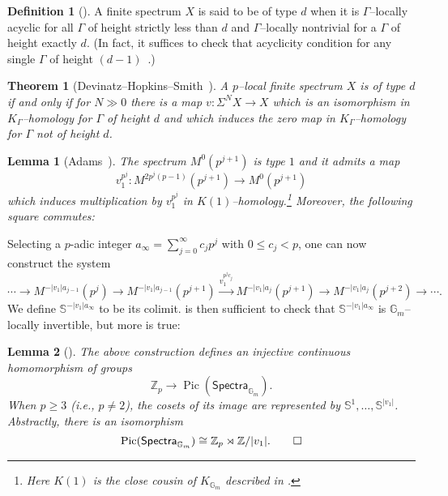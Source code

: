 \documentclass{amsart}
\newcommand{\Z}{\mathbb Z}
\renewcommand{\S}{\mathbb S}
\newcommand{\G}{\mathbb G}
\newcommand{\<}{\langle}
\renewcommand{\>}{\rangle}
\newcommand{\Susp}{\Sigma}
\newcommand{\CatOf}[1]{\mathsf{#1}}
\DeclareMathOperator{\Pic}{Pic}
\theoremstyle{plain}
\newtheorem*{theorem}{Theorem}
\newtheorem*{lemma}{Lemma}
\theoremstyle{definition}
\newtheorem*{definition}{Definition}
\theoremstyle{remark}
\begin{document}
\begin{definition}[{\cite[Definition 1.5.3]{RavenelOrangeBook}}]
A finite spectrum $X$ is said to be of type $d$ when it is $\Gamma$--locally acyclic for all $\Gamma$ of height strictly less than $d$ and $\Gamma$--locally nontrivial for a $\Gamma$ of height exactly $d$.  (In fact, it suffices to check that acyclicity condition for any single $\Gamma$ of height $(d-1)$~\cite[Theorem 2.11]{RavenelLocalizationWRTPeriodic}.)
\end{definition}

\begin{theorem}[{Devinatz--Hopkins--Smith~\cite[Theorem 9]{HopkinsSmith}}]
A $p$--local finite spectrum $X$ is of type $d$ if and only if for $N \gg 0$ there is a map $v: \Susp^N X \to X$ which is an isomorphism in $K_\Gamma$--homology for $\Gamma$ of height $d$ and which induces the zero map in $K_\Gamma$--homology for $\Gamma$ not of height $d$.
\end{theorem}

\begin{lemma}[{Adams~\cite[Lemma 12.5]{AdamsJXIV}}]\label{AdamsSelfMaps}
The spectrum $M^0(p^{j+1})$ is type $1$ and it admits a map \[v_1^{p^j}: M^{2p^j(p-1)}(p^{j+1}) \to M^0(p^{j+1})\] which induces multiplication by $v_1^{p^j}$ in $K(1)$--homology.\footnote{Here $K(1)$ is the close cousin of $K_{\G_m}$ described in .} Moreover, the following square commutes:
\begin{center}
\end{center}
\end{lemma}

Selecting a $p$-adic integer $a_\infty = \sum_{j=0}^\infty c_j p^j$ with $0 \le c_j < p$, one can now construct the system \[\cdots \to M^{-|v_1| a_{j-1}}(p^j) \to M^{-|v_1| a_{j-1}}(p^{j+1}) \xrightarrow{v_1^{p^j c_j}} M^{-|v_1| a_j}(p^{j+1}) \to M^{-|v_1| a_j}(p^{j+2}) \to \cdots.\] We define $\S^{-|v_1|a_\infty}$ to be its colimit.   is then sufficient to check that $\S^{-|v_1| a_\infty}$ is $\G_m$--locally invertible, but more is true:
\begin{lemma}[{\cite[Proposition 2.1]{HMS}}]\label{padicPicElements}
The above construction defines an injective continuous homomorphism of groups \[\Z_p \to \Pic(\CatOf{Spectra}_{\G_m}).\]  When $p \ge 3$ (i.e., $p \ne 2$), the cosets of its image are represented by $\S^1, \ldots, \S^{|v_1|}$.  Abstractly, there is an isomorphism \[\Pic(\CatOf{Spectra}_{\G_m}) \cong \Z_p \rtimes \Z/|v_1|. \qed\]
\end{lemma}
\end{document}
